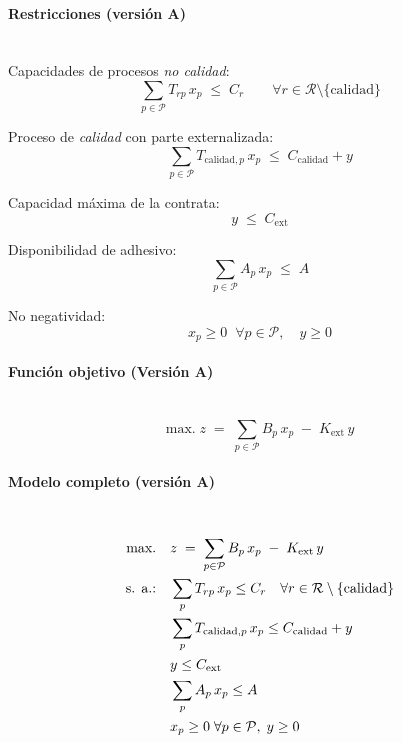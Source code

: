 \paragraph{Restricciones (versión A)}\mbox{}\\
Capacidades de procesos \emph{no calidad}:
\begin{equation}
    \sum_{p \in \mathcal{P}} T_{rp}\,x_p \;\le\; C_r \qquad \forall r \in \mathcal{R}\setminus\{\mathrm{calidad}\}
\end{equation}

Proceso de \emph{calidad} con parte externalizada:
\begin{equation}
    \sum_{p \in \mathcal{P}} T_{\mathrm{calidad},p}\,x_p \;\le\; C_{\mathrm{calidad}} + y
\end{equation}

Capacidad máxima de la contrata:
\begin{equation}
    y \;\le\; C_{\mathrm{ext}}
\end{equation}

Disponibilidad de adhesivo:
\begin{equation}
    \sum_{p \in \mathcal{P}} A_p\,x_p \;\le\; A
\end{equation}

No negatividad:
\begin{equation}
    x_p \ge 0 \;\;\forall p \in \mathcal{P}, \quad y \ge 0
\end{equation}

\paragraph{Función objetivo (Versión A)}\mbox{}\\
\begin{equation}
\mbox{max.}\; z \;=\; \sum_{p \in \mathcal{P}} B_p\,x_p \;-\; K_{\mathrm{ext}}\,y
\end{equation}

\paragraph{Modelo completo (versión A)}\mbox{}\\
\begin{align}
\mbox{max.}\quad & z \;=\; \sum_{p \in \mathcal{P}} B_p\,x_p \;-\; K_{\mathrm{ext}}\,y \notag\\
\mbox{s. a.:}\quad 
& \sum_{p} T_{rp}\,x_p \le C_r \quad \forall r \in \mathcal{R}\setminus\{\mathrm{calidad}\} \notag\\
& \sum_{p} T_{\mathrm{calidad},p}\,x_p \le C_{\mathrm{calidad}} + y \notag\\
& y \le C_{\mathrm{ext}} \notag\\
& \sum_{p} A_p\,x_p \le A \notag\\
& x_p \ge 0 \;\forall p \in \mathcal{P},\; y \ge 0 \notag
\end{align}

